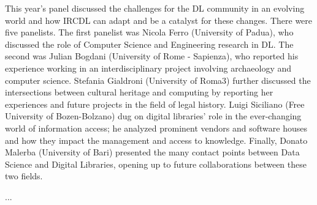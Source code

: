 \documentclass[sigconf, nonacm]{acmart}
\begin{document}
This year's panel discussed the challenges for the DL community in an evolving world and how IRCDL can adapt and be a catalyst for these changes. There were five panelists. The first panelist was Nicola Ferro (University of Padua), who discussed the role of Computer Science and Engineering research in DL. The second was Julian Bogdani (University of Rome - Sapienza), who reported his experience working in an interdisciplinary project involving archaeology and computer science. Stefania Gialdroni (University of Roma3) further discussed the intersections between cultural heritage and computing by reporting her experiences and future projects in the field of legal history. Luigi Siciliano (Free University of Bozen-Bolzano) dug on digital libraries' role in the ever-changing world of information access; he analyzed prominent vendors and software houses and how they impact the management and access to knowledge. Finally, Donato Malerba (University of Bari) presented the many contact points between Data Science and Digital Libraries, opening up to future collaborations between these two fields. 




\begin{acks}
...
\end{acks}



\end{document}
